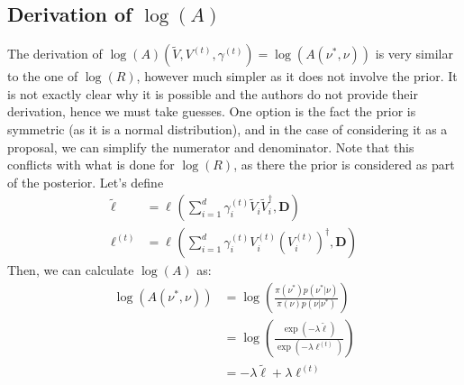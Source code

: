 \documentclass[12pt]{memoir}
\newcommand{\mb}{\mathbf}
\begin{document}
\subsection*{Derivation of $\log(A)$}
The derivation of $\log(A)(\tilde V, V^{(t)}, \gamma^{(t)}) = \log(A(\nu^*, \nu))$ is very similar to the one of $\log(R)$, however much simpler as it does not involve the prior. It is not exactly clear why it is possible and the authors do not provide their derivation, hence we must take guesses. One option is the fact the prior is symmetric (as it is a normal distribution), and in the case of considering it as a proposal, we can simplify the numerator and denominator. Note that this conflicts with what is done for $\log(R)$, as there the prior is considered as part of the posterior. Let's define
\begin{align}
    \tilde \ell &= \ell^{}(\sum_{i=1}^{d} \gamma_i^{(t)} \tilde V_i \tilde V_i^\dagger, \mb D)\\
    \ell^{(t)} &= \ell^{}(\sum_{i=1}^{d} \gamma_i^{(t)} V_i^{(t)} (V_i^{(t)})^\dagger, \mb D)
\end{align}
Then, we can calculate $\log(A)$ as:
\begin{align}
    \log(A(\nu^*, \nu)) &= \log(\frac{\pi(\nu^*) p(\nu^*|\nu)}{\pi(\nu) p(\nu|\nu^*)})\\
                        &= \log(\frac{\exp(-\lambda \tilde \ell)}{\exp(-\lambda \ell^{(t)})})\\
                        &= -\lambda \tilde \ell + \lambda \ell^{(t)}
\end{align}

\end{document}

